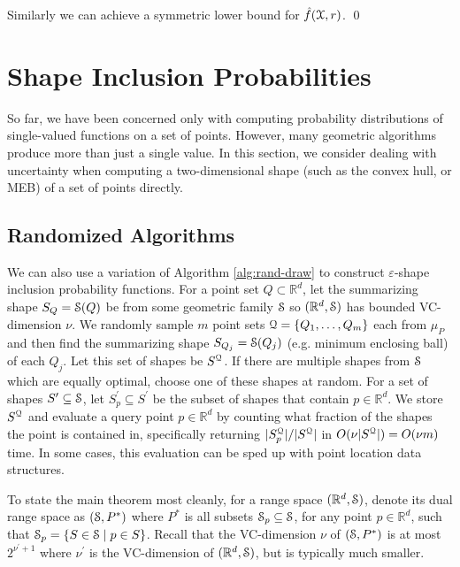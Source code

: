 \documentclass{journal}
\newcommand{\eps}{\varepsilon}
\newcommand{\Eu}[1]{\ensuremath{\EuScript{#1}}}
\newcommand{\R}{\ensuremath{\mathbb{R}}}
\begin{document}
Similarly we can achieve a symmetric lower bound for $\hat f(\Eu X,r)$.  \qed
























\section {Shape Inclusion Probabilities}

So far, we have been concerned only with computing probability distributions of single-valued functions on a set of points. However, many geometric algorithms produce more than just a single value. In this section, we consider dealing with uncertainty when computing a two-dimensional shape (such as the convex hull, or MEB) of a set of points directly.


\subsection{Randomized Algorithms}
We can also use a variation of Algorithm \ref{alg:rand-draw} to construct $\eps$-shape inclusion probability functions.
For a point set $Q \subset \R^d$, let the summarizing shape $S_Q = \Eu{S}(Q)$ be from some geometric family $\Eu{S}$ so $(\R^d, \Eu{S})$ has bounded VC-dimension $\nu$.
We randomly sample $m$ point sets $\Eu{Q} = \{Q_1, \ldots, Q_m\}$ each from $\mu_P$ and then find the summarizing shape $S_{Q_j} = \Eu{S}(Q_j)$ (e.g. minimum enclosing ball) of each $Q_j$.  Let this set of shapes be $S^{\Eu{Q}}$.  If there are multiple shapes from $\Eu{S}$ which are equally optimal, choose one of these shapes at random.
For a set of shapes $S^\prime \subseteq \Eu{S}$, let $S^\prime_p \subseteq S^\prime$ be the subset of shapes that contain $p \in \R^d$.
We store $S^{\Eu{Q}}$ and evaluate a query point $p \in \R^d$ by counting what fraction of the shapes the point is contained in, specifically returning $|S^{\Eu{Q}}_p| / |S^{\Eu{Q}}|$ in $O(\nu |S^{\Eu{Q}}|) = O(\nu m)$ time.  In some cases, this evaluation can be sped up with point location data structures.

To state the main theorem most cleanly, for a range space $(\R^d, \Eu{S})$, denote its dual range space as $(\Eu{S}, P^*)$ where $P^*$ is all subsets $\Eu{S}_p \subseteq \Eu{S}$, for any point $p \in \R^d$, such that $\Eu{S}_p = \{S \in \Eu{S} \mid p \in S\}$.  Recall that the VC-dimension $\nu$ of $(\Eu{S}, P^*)$ is at most $2^{\nu^\prime+1}$ where $\nu^\prime$ is the VC-dimension of $(\R^d, \Eu{S})$, but is typically much smaller.  
\end{document}
